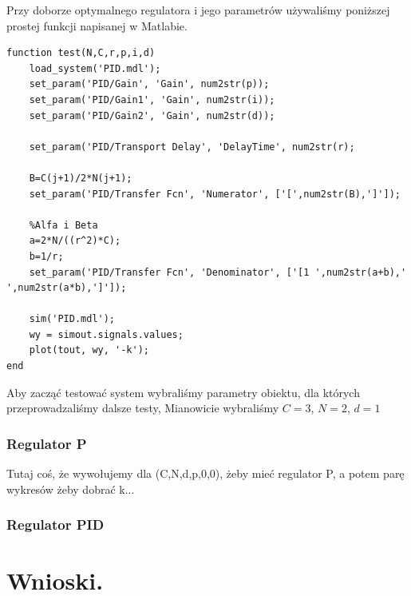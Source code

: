 \documentclass[a4paper,10pt]{article}
\begin{document}
Przy doborze optymalnego regulatora i jego parametrów używaliśmy poniższej prostej funkcji napisanej w Matlabie.

\begin{lstlisting}[caption=Funkcja testująca system.]
function test(N,C,r,p,i,d)
    load_system('PID.mdl');
    set_param('PID/Gain', 'Gain', num2str(p));   
    set_param('PID/Gain1', 'Gain', num2str(i));   
    set_param('PID/Gain2', 'Gain', num2str(d));
   
    set_param('PID/Transport Delay', 'DelayTime', num2str(r);        
        
    B=C(j+1)/2*N(j+1);
    set_param('PID/Transfer Fcn', 'Numerator', ['[',num2str(B),']']);        
        
    %Alfa i Beta 
    a=2*N/((r^2)*C);
    b=1/r;
    set_param('PID/Transfer Fcn', 'Denominator', ['[1 ',num2str(a+b),' ',num2str(a*b),']']);        
        
    sim('PID.mdl');
    wy = simout.signals.values;    
  	plot(tout, wy, '-k');
end
\end{lstlisting}

Aby zacząć testować system wybraliśmy parametry obiektu, dla których przeprowadzaliśmy dalsze testy, Mianowicie wybraliśmy $C = 3$, $N = 2$, $d = 1$

\newpage
\subsubsection{Regulator P}

Tutaj coś, że wywołujemy dla (C,N,d,p,0,0), żeby mieć regulator P, a potem parę wykresów żeby dobrać k...

\subsubsection{Regulator PID}

\section{Wnioski.}\label{sec:wnioski}
\end{document}
